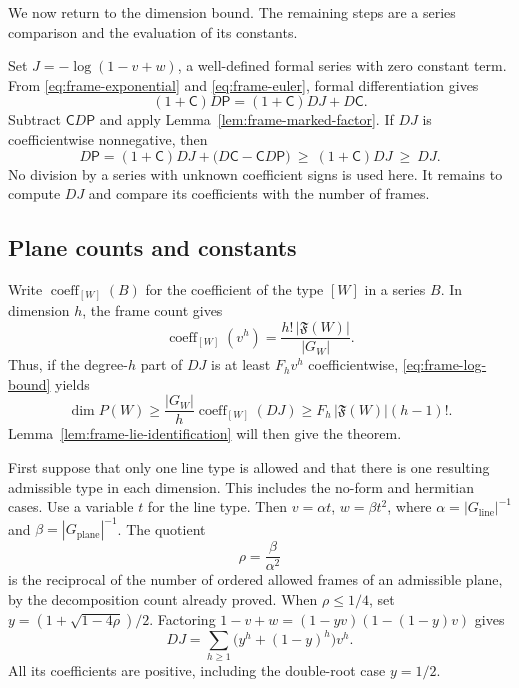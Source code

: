 We now return to the dimension bound. The remaining steps are a series
comparison and the evaluation of its constants.

Set $J=-\log(1-v+w)$, a well-defined formal series with zero constant
term.  From \eqref{eq:frame-exponential} and \eqref{eq:frame-euler},
formal differentiation gives
\[
 (1+\mathsf C)D\mathsf P=(1+\mathsf C)DJ+D\mathsf C.
\]
Subtract $\mathsf C D\mathsf P$ and apply
Lemma~\ref{lem:frame-marked-factor}.  If $DJ$ is coefficientwise
nonnegative, then
\begin{equation}\label{eq:frame-log-bound}
 D\mathsf P
 =(1+\mathsf C)DJ+
   \bigl(D\mathsf C-\mathsf C D\mathsf P\bigr)
 \ \geq\ (1+\mathsf C)DJ\ \geq\ DJ.
\end{equation}
No division by a series with unknown coefficient signs is used here.
It remains to compute $DJ$ and compare its coefficients with the
number of frames.

\subsection{Plane counts and constants}

Write $\operatorname{coeff}_{[W]}(B)$ for the coefficient of the type
$[W]$ in a series $B$.  In dimension $h$, the frame count gives
\begin{equation}\label{eq:frame-count-normalization}
 \operatorname{coeff}_{[W]}(v^h)
   =\frac{h!\,|\mathfrak F(W)|}{|G_W|}.
\end{equation}
Thus, if the degree-$h$ part of $DJ$ is at least $F_hv^h$
coefficientwise, \eqref{eq:frame-log-bound} yields
\[
 \dim P(W)\geq\frac{|G_W|}{h}\operatorname{coeff}_{[W]}(DJ)
 \geq F_h\,|\mathfrak F(W)|(h-1)!.
\]
Lemma~\ref{lem:frame-lie-identification} will then give the theorem.

First suppose that only one line type is allowed and that there is
one resulting admissible type in each dimension.  This includes the
no-form and hermitian cases.  Use a variable $t$ for the line type.
Then $v=\alpha t$, $w=\beta t^2$, where
$\alpha=|G_{\text{line}}|^{-1}$ and
$\beta=|G_{\text{plane}}|^{-1}$.  The quotient
\[
 \rho=\frac{\beta}{\alpha^2}
\]
is the reciprocal of the number of ordered allowed frames of an
admissible plane, by the decomposition count already proved.  When
$\rho\leq1/4$, set $y=(1+\sqrt{1-4\rho})/2$.  Factoring
$1-v+w=(1-yv)(1-(1-y)v)$ gives
\begin{equation}\label{eq:frame-two-roots}
 DJ=\sum_{h\geq1}\bigl(y^h+(1-y)^h\bigr)v^h.
\end{equation}
All its coefficients are positive, including the double-root case
$y=1/2$.

